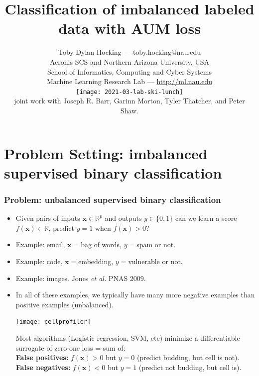 \documentclass[t]{beamer}
\begin{document}
\title{Classification of imbalanced labeled data with AUM loss}

\author{
  Toby Dylan Hocking --- toby.hocking@nau.edu\\
  Acronis SCS and Northern Arizona University, USA\\
  School of Informatics, Computing and Cyber Systems\\
  Machine Learning Research Lab --- \url{http://ml.nau.edu}\\
  \texttt{[image: 2021-03-lab-ski-lunch]} \\
  joint work with Joseph R. Barr, Garinn Morton, Tyler Thatcher, and Peter Shaw.\\
}

\date{}

\maketitle

\section{Problem Setting: imbalanced supervised  binary classification}

\begin{frame}
  \frametitle{Problem: unbalanced supervised binary classification}
  
  \begin{itemize}
  \item Given pairs of inputs $\mathbf x\in\mathbb R^p$ and outputs
    $y\in\{0,1\}$ can we learn a score 
    $f(\mathbf x)\in\mathbb R$, predict $y=1$ when $f(\mathbf x)>0$?
  \item Example: email, $\mathbf x =$bag of words, $y=$spam or not.
  \item Example: code, $\mathbf x =$embedding, $y=$vulnerable or not.
  \item Example: images. Jones {\it et al.} PNAS 2009.
  \item In all of these examples, we typically have many more negative
    examples than positive examples (unbalanced).
    \parbox{1.5in}{\texttt{[image: cellprofiler]}}
    \parbox{2.4in}{Most algorithms (Logistic regression, SVM, etc) minimize a differentiable surrogate of zero-one loss = sum of:\\
      \textbf{False positives:} $f(\mathbf x)>0$ but $y=0$ (predict
      budding, but cell is not).\\
      \textbf{False negatives:} $f(\mathbf x)<0$ but $y=1$ (predict
      not budding, but cell is).
  }
  \end{itemize} 
\end{frame}
\end{document}

